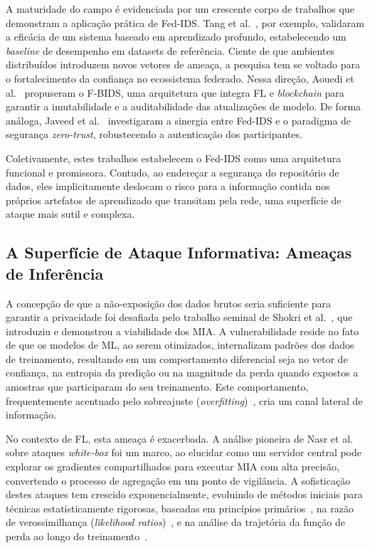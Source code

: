 \documentclass[
	12pt,				%
	openright,			%
	oneside,			%
	a4paper,			%
	english,			%
	french,				%
	spanish,			%
	brazil,				%
	]{abntex2}
\begin{document}
A maturidade do campo é evidenciada por um crescente corpo de trabalhos que demonstram a aplicação prática de Fed-IDS. Tang et al.~\cite{tang2022fedids}, por exemplo, validaram a eficácia de um sistema baseado em aprendizado profundo, estabelecendo um \textit{baseline} de desempenho em datasets de referência. Ciente de que ambientes distribuídos introduzem novos vetores de ameaça, a pesquisa tem se voltado para o fortalecimento da confiança no ecossistema federado. Nessa direção, Aouedi et al.~\cite{aouedi2023blockchainids} propuseram o F-BIDS, uma arquitetura que integra FL e \textit{blockchain} para garantir a imutabilidade e a auditabilidade das atualizações de modelo. De forma análoga, Javeed et al.~\cite{javeed2024zerotrust} investigaram a sinergia entre Fed-IDS e o paradigma de segurança \textit{zero-trust}, robustecendo a autenticação dos participantes.

Coletivamente, estes trabalhos estabelecem o Fed-IDS como uma arquitetura funcional e promissora. Contudo, ao endereçar a segurança do repositório de dados, eles implicitamente deslocam o risco para a informação contida nos próprios artefatos de aprendizado que transitam pela rede, uma superfície de ataque mais sutil e complexa.

\subsection{A Superfície de Ataque Informativa: Ameaças de Inferência}

A concepção de que a não-exposição dos dados brutos seria suficiente para garantir a privacidade foi desafiada pelo trabalho seminal de Shokri et al.~\cite{shokri2017mia}, que introduziu e demonstrou a viabilidade dos MIA. A vulnerabilidade reside no fato de que os modelos de ML, ao serem otimizados, internalizam padrões dos dados de treinamento, resultando em um comportamento diferencial  seja no vetor de confiança, na entropia da predição ou na magnitude da perda  quando expostos a amostras que participaram do seu treinamento. Este comportamento, frequentemente acentuado pelo sobreajuste (\textit{overfitting})~\cite{yeom2018privacyrisk}, cria um canal lateral de informação.

No contexto de FL, esta ameaça é exacerbada. A análise pioneira de Nasr et al.~\cite{nasr2019comprehensive} sobre ataques \textit{white-box} foi um marco, ao elucidar como um servidor central pode explorar os gradientes compartilhados para executar MIA com alta precisão, convertendo o processo de agregação em um ponto de vigilância. A sofisticação destes ataques tem crescido exponencialmente, evoluindo de métodos iniciais para técnicas estatisticamente rigorosas, baseadas em princípios primários~\cite{carlini2022firstprinciples}, na razão de verossimilhança (\textit{likelihood ratios})~\cite{carlini2022lira}, e na análise da trajetória da função de perda ao longo do treinamento~\cite{liu2022trajectory}.
\end{document}
